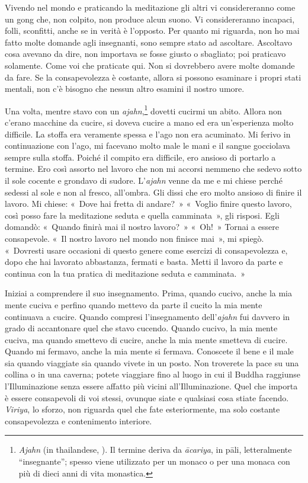 Vivendo nel mondo e praticando la meditazione gli altri vi
considereranno come un gong che, non colpito, non produce alcun suono.
Vi considereranno incapaci, folli, sconfitti, anche se in verità è
l'opposto. Per quanto mi riguarda, non ho mai fatto molte domande agli
insegnanti, sono sempre stato ad ascoltare. Ascoltavo cosa avevano da
dire, non importava se fosse giusto o sbagliato; poi praticavo
solamente. Come voi che praticate qui. Non si dovrebbero avere molte
domande da fare. Se la consapevolezza è costante, allora si possono
esaminare i propri stati mentali, non c'è bisogno che nessun altro
esamini il nostro umore.

Una volta, mentre stavo con un \emph{ajahn},\footnote{\emph{Ajahn} (in
  thailandese, ).
  Il termine deriva da \emph{ācariya}, in pāli, letteralmente
  ``insegnante''; spesso viene utilizzato per un monaco o per una monaca
  con più di dieci anni di vita monastica.} dovetti cucirmi un abito.
Allora non c'erano macchine da cucire, si doveva cucire a mano ed era
un'esperienza molto difficile. La stoffa era veramente spessa e l'ago
non era acuminato. Mi ferivo in continuazione con l'ago, mi facevano
molto male le mani e il sangue gocciolava sempre sulla stoffa. Poiché il
compito era difficile, ero ansioso di portarlo a termine. Ero così
assorto nel lavoro che non mi accorsi nemmeno che sedevo sotto il sole
cocente e grondavo di sudore. L'\emph{ajahn} venne da me e mi chiese
perché sedessi al sole e non al fresco, all'ombra. Gli dissi che ero
molto ansioso di finire il lavoro. Mi chiese: «~Dove hai fretta di
andare?~» «~Voglio finire questo lavoro, così posso fare la meditazione
seduta e quella camminata~», gli risposi. Egli domandò: «~Quando finirà
mai il nostro lavoro?~» «~Oh!~» Tornai a essere consapevole. «~Il nostro
lavoro nel mondo non finisce mai~», mi spiegò. «~Dovresti usare
occasioni di questo genere come esercizi di consapevolezza e, dopo che
hai lavorato abbastanza, fermati e basta. Metti il lavoro da parte e
continua con la tua pratica di meditazione seduta e camminata.~»

Iniziai a comprendere il suo insegnamento. Prima, quando cucivo, anche
la mia mente cuciva e perfino quando mettevo da parte il cucito la mia
mente continuava a cucire. Quando compresi l'insegnamento
dell'\emph{ajahn} fui davvero in grado di accantonare quel che stavo
cucendo. Quando cucivo, la mia mente cuciva, ma quando smettevo di
cucire, anche la mia mente smetteva di cucire. Quando mi fermavo, anche
la mia mente si fermava. Conoscete il bene e il male sia quando
viaggiate sia quando vivete in un posto. Non troverete la pace su una
collina o in una caverna; potete viaggiare fino al luogo in cui il
Buddha raggiunse l'Illuminazione senza essere affatto più vicini
all'Illuminazione. Quel che importa è essere consapevoli di voi stessi,
ovunque siate e qualsiasi cosa stiate facendo. \emph{Viriya}, lo sforzo,
non riguarda quel che fate esteriormente, ma solo costante
consapevolezza e contenimento interiore.

